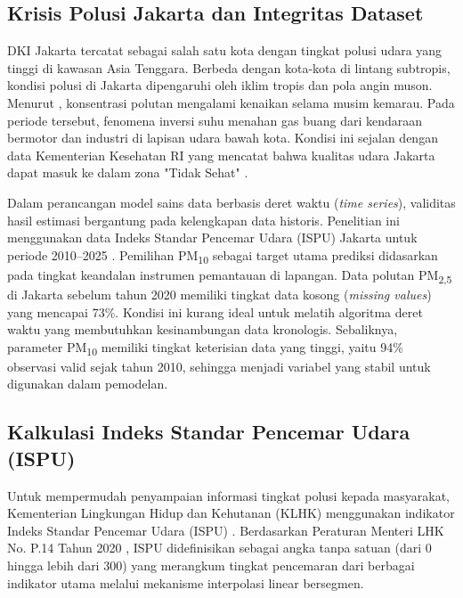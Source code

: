 \subsection{Krisis Polusi Jakarta dan Integritas Dataset}
DKI Jakarta tercatat sebagai salah satu kota dengan tingkat polusi udara yang tinggi di kawasan Asia Tenggara. Berbeda dengan kota-kota di lintang subtropis, kondisi polusi di Jakarta dipengaruhi oleh iklim tropis dan pola angin muson. Menurut \textcite{firdaus2023jakarta}, konsentrasi polutan mengalami kenaikan selama musim kemarau. Pada periode tersebut, fenomena inversi suhu menahan gas buang dari kendaraan bermotor dan industri di lapisan udara bawah kota. Kondisi ini sejalan dengan data Kementerian Kesehatan RI yang mencatat bahwa kualitas udara Jakarta dapat masuk ke dalam zona "Tidak Sehat" \autocite{kemkes2019air, aulia2024air}.

Dalam perancangan model sains data berbasis deret waktu (\textit{time series}), validitas hasil estimasi bergantung pada kelengkapan data historis. Penelitian ini menggunakan data Indeks Standar Pencemar Udara (ISPU) Jakarta untuk periode 2010--2025 \autocite{pohan2025jakarta}. Pemilihan PM\textsubscript{10} sebagai target utama prediksi didasarkan pada tingkat keandalan instrumen pemantauan di lapangan. Data polutan PM\textsubscript{2,5} di Jakarta sebelum tahun 2020 memiliki tingkat data kosong (\textit{missing values}) yang mencapai 73\%. Kondisi ini kurang ideal untuk melatih algoritma deret waktu yang membutuhkan kesinambungan data kronologis. Sebaliknya, parameter PM\textsubscript{10} memiliki tingkat keterisian data yang tinggi, yaitu 94\% observasi valid sejak tahun 2010, sehingga menjadi variabel yang stabil untuk digunakan dalam pemodelan.

\subsection{Kalkulasi Indeks Standar Pencemar Udara (ISPU)}

Untuk mempermudah penyampaian informasi tingkat polusi kepada masyarakat, Kementerian Lingkungan Hidup dan Kehutanan (KLHK) menggunakan indikator Indeks Standar Pencemar Udara (ISPU) \autocite{chaniago2020ispu}. Berdasarkan Peraturan Menteri LHK No. P.14 Tahun 2020 \autocite{permenlhk2020ispu}, ISPU didefinisikan sebagai angka tanpa satuan (dari 0 hingga lebih dari 300) yang merangkum tingkat pencemaran dari berbagai indikator utama melalui mekanisme interpolasi linear bersegmen.

